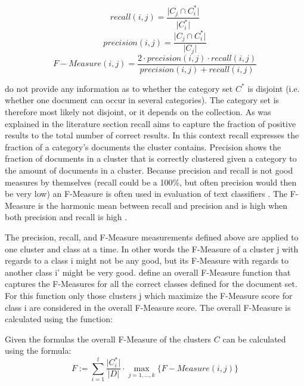 \begin{displaymath}
recall(i,j) = \frac{\vert C_{j} \cap C_i^* \vert}{\vert C_i^* \vert}
\end{displaymath}
\begin{displaymath}
precision(i,j) = \frac{\vert C_{j} \cap C_i^* \vert}{\vert C_{j} \vert}
\end{displaymath}
\begin{displaymath}
F-Measure(i,j) = \frac{2 \cdot precision(i,j) \cdot recall(i,j)}{precision(i,j) + recall(i,j)}
\end{displaymath}

\cite{Chim2007} do not provide any information as to whether the category set \(C^*\) is disjoint (i.e. whether one document can occur in several categories). The category set is therefore most likely not disjoint, or it depends on the collection. As was explained in the literature section recall aims to capture the fraction of positive results to the total number of correct results. In this context recall expresses the fraction of a category's documents the cluster contains. Precision shows the fraction of documents in a cluster that is correctly clustered given a category to the amount of documents in a cluster. Because precision and recall is not good measures by themselves (recall could be a 100\%, but often precision would then be very low) an F-Measure is often used in evaluation of text classifiers \cite{Baeza-Yates2011a}. The F-Measure is the harmonic mean between recall and precision and is high when both precision and recall is high \cite{Baeza-Yates2011b}. 

The precision, recall, and F-Measure measurements defined above are applied to one cluster and class at a time. In other words the F-Measure of a cluster j with regards to a class i might not be any good, but its F-Measure with regards to another class i' might be very good. \cite{Chim2007} define an overall F-Measure function that captures the F-Measures for all the correct classes defined for the document set. For this function only those clusters j which maximize the F-Measure score for class i are considered in the overall F-Measure score. The overall F-Measure is calculated using the function:

Given the formulas the overall F-Measure of the clusters \(C\) can be calculated using the formula:
\begin{displaymath}
F := \sum_{i=1}^{l} \frac{\vert C_i^* \vert}{\vert D \vert} \cdot \max_{j=1,\dots,k} \{F-Measure(i,j)\}
\end{displaymath}


